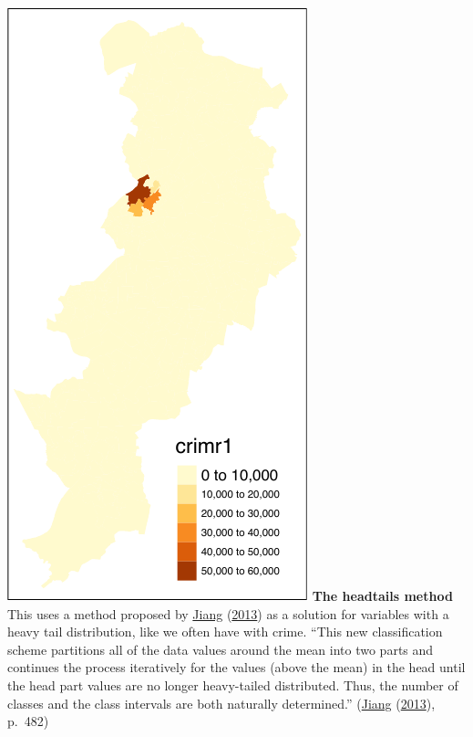 \documentclass[
]{book}
\newenvironment{Shaded}{\begin{snugshade}}{\end{snugshade}}
\newcommand{\AttributeTok}[1]{\textcolor[rgb]{0.77,0.63,0.00}{#1}}
\newcommand{\FunctionTok}[1]{\textcolor[rgb]{0.00,0.00,0.00}{#1}}
\newcommand{\NormalTok}[1]{#1}
\newcommand{\OtherTok}[1]{\textcolor[rgb]{0.56,0.35,0.01}{#1}}
\newcommand{\SpecialCharTok}[1]{\textcolor[rgb]{0.00,0.00,0.00}{#1}}
\newcommand{\StringTok}[1]{\textcolor[rgb]{0.31,0.60,0.02}{#1}}
\begin{document}
\includegraphics{crime_mapping_files/figure-latex/unnamed-chunk-85-1.pdf}
\textbf{The headtails method} This uses a method proposed by \protect\hyperlink{ref-Jiang_2013}{Jiang} (\protect\hyperlink{ref-Jiang_2013}{2013}) as a solution for variables with a heavy tail distribution, like we often have with crime. ``This new classification scheme partitions all of the data values around the mean into two parts and continues the process iteratively for the values (above the mean) in the head until the head part values are no longer heavy-tailed distributed. Thus, the number of classes and the class intervals are both naturally determined.'' (\protect\hyperlink{ref-Jiang_2013}{Jiang} (\protect\hyperlink{ref-Jiang_2013}{2013}), p.~482)

\begin{Shaded}
\end{Shaded}
\end{document}

